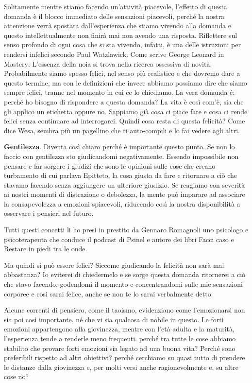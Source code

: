 \documentclass[12pt]{book} %
\begin{document}
Solitamente mentre stiamo facendo un'attività
piacevole, l'effetto di questa domanda è il blocco immediato delle sensazioni piacevoli, perché la
nostra attenzione verrà spostata dall'esperienza che stiamo vivendo alla domanda e questo
intellettualmente non finirà mai non avendo una risposta. Riflettere sul senso profondo di ogni cosa che si sta
vivendo, infatti, è una delle istruzioni per rendersi infelici secondo Paul Watzlawick. Come scrive George
Leonard in Mastery: L'essenza della noia si trova nella ricerca ossessiva di novità. Probabilmente
siamo spesso felici, nel senso più realistico e che dovremo dare a questo termine, ma con le definizioni che invece
abbiamo possiamo dire che siamo sempre felici, tranne nel momento in cui ce lo chiediamo.
La vera domanda é: perché ho bisogno di rispondere a questa domanda? La vita è così com'è, sia che gli applico un etichetta oppure no. Sappiamo già cosa ci piace fare e cosa ci rende felici senza continuare ad interrogarci. Quindi cosa resta di questa felicità? Come dice Wesa, sembra più un pagellino che ti auto-compili e lo fai vedere agli altri. 

\textbf{Gentilezza}. Diventa così chiaro perché è importante questo punto. Se non lo faccio con gentilezza sto giudicandomi
negativamente. Essendo impossibile non pensare e far sorgere i giudizi che sono le opinioni sulle cose che creano
turbamento di cui parlava Epitteto, la cosa giusta da fare e ritornare a ciò che stavamo facendo senza aggiungere un
ulteriore giudizio. Se reagiamo con severità ai nostri momenti di distrazione o debolezza, la mente può imparare ad associare la consapevolezza a emozioni spiacevoli, riducendo così la nostra disponibilità a osservare i pensieri nel futuro.

Tutti questi concetti li ho presi in prestito da Gennaro Romagnoli uno psicologo e psicoterapeuta che conduce il podcast
di Psinel e autore dei libri Facci caso e Restare in piedi tra le onde.

Ma quindi si può essere felici? Siccome giudicando la felicità non sarà mai abbastanza? Io eviterei di chiedermelo e se
sorge questa domanda ritornerei a ciò che stavo facendo, godendomi il momento e concentrandomi sulle mie sensazioni
corporee e così sarai felice, anche se non te lo sarai verbalmente detto. 

Alcune correnti di pensiero, come il taoismo, evidenziano come l'emozionarsi non sia poi così importante, né che vi sia qualcosa di nobile in questo. Le forti emozioni appartengono alla giovinezza, mentre con l'età adulta e la maturità, l'esperienza tende a renderle meno frequenti. perché tra tutte le cose abbiamo stabilito che provare forti emozioni sia legato ad una buona vita? Perché sono preferibili rispetto ad altri obiettivi? perché cerchiamo su quasi tutto di prendere le distanze dalla giovinezza e, per molti versi anche ragionevolmente e, su altre cose no?
\end{document}
